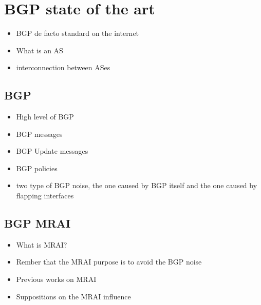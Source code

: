 \chapter{BGP state of the art}
\label{cha:bgp_art}

\begin{itemize}
    \item BGP de facto standard on the internet
    \item What is an AS
    \item interconnection between ASes
\end{itemize}

\section{BGP}
\label{sec:bgp_intro}

\begin{itemize}
    \item High level of BGP
    \item BGP messages
    \item BGP Update messages
    \item BGP policies
	\item two type of BGP noise, the one caused by BGP itself and the one 
		caused by flapping interfaces
\end{itemize}

%

\section{BGP MRAI}
\label{sec:bgp_mrai}

\begin{itemize}
    \item What is MRAI?
	\item Rember that the MRAI purpose is to avoid the BGP noise
    \item Previous works on MRAI
    \item Suppositions on the MRAI influence
\end{itemize}

